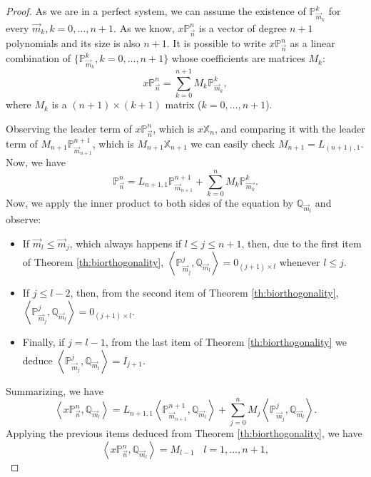 \documentclass[12pt,a4]{article}
\theoremstyle{plain}
\newcommand{\prodesc}[2]{\left\langle #1 , #2 \right\rangle}
\begin{document}
\begin{proof}
    As we are in a perfect system, we can assume the existence of $\mathbb P_{\overrightarrow{m}_k}^k$ for every $\vec m_k, k=0,\dots,n+1$. As we know, $x\mathbb P_{\vec n}^n$ is a vector of degree $n+1$ polynomials and its size is also $n+1$. It is possible to write  $x\mathbb P_{\vec n}^n$ as a linear combination of $\{\mathbb P_{\overrightarrow{m}_k}^k, k=0,\dots,n+1\}$ whose coefficients are matrices $M_k$:
    $$
    x\mathbb P_{\overrightarrow{n}}^n = \sum_{k=0}^{n+1} M_k \mathbb P_{\overrightarrow{m}_k}^k,
    $$
    where $M_k$ is a $(n+1)\times(k+1)$ matrix ($k=0,\dots,n+1$).

    Observing the leader term of $x\mathbb P_{\overrightarrow{n}}^n$, which is $x\mathbb X_{n}$, and comparing it with the leader term of $M_{n+1} \mathbb P_{\overrightarrow{m}_{n+1}}^{n+1}$, which is $M_{n+1}\mathbb X_{n+1}$ we can easily check $M_{n+1}=L_{(n+1),1}$. Now, we have
    $$
    \mathbb P_{\overrightarrow{n}}^n = L_{n+1,1}\mathbb P_{\overrightarrow{m}_{n+1}}^{n+1} + \sum_{k=0}^{n} M_k \mathbb P_{\overrightarrow{m_k}}^k.
    $$
    Now, we apply the inner product to both sides of the equation by $\mathbb Q_{\overrightarrow{m}_l}$ and observe:
    \begin{itemize}
        \item If $\overrightarrow{m}_l\leq \overrightarrow{m}_j$, which always happens if $l\leq j\leq n+1$, then, due to the first item of Theorem \ref{th:biorthogonality}, $\prodesc{\mathbb P_{\overrightarrow{m}_j}^j}{\mathbb Q_{\overrightarrow{m}_l}} = 0_{(j+1)\times l}$ whenever $l\leq j$.
        \item If $j\leq l-2$, then, from the second item of Theorem \ref{th:biorthogonality}, $\prodesc{\mathbb P_{\overrightarrow{m}_j}^j}{\mathbb Q_{\overrightarrow{m}_l}} = 0_{(j+1)\times l}.$
        \item Finally, if $j=l-1$, from the last item of Theorem \ref{th:biorthogonality} we deduce $\prodesc{\mathbb P_{\overrightarrow{m}_j}^j}{\mathbb Q_{\overrightarrow{m}_l}} = I_{j+1}.$
    \end{itemize}

    Summarizing, we have
    $$
    \prodesc{x\mathbb P_{\vec n}^n}{\mathbb Q_{\overrightarrow{m}_l}} = L_{n+1,1}\prodesc{\mathbb P_{\overrightarrow{m}_{n+1}}^{n+1}}{\mathbb Q_{\overrightarrow{m}_l}} + \sum_{j=0}^n M_j \prodesc{\mathbb P_{\overrightarrow{m}_j}^j}{\mathbb Q_{\overrightarrow{m}_l}}.
    $$
    Applying the previous items deduced from Theorem \ref{th:biorthogonality}, we have
    \begin{equation}
        \label{eq:biorthogonality-1}
        \prodesc{x\mathbb P_{\vec n}^n}{\mathbb Q_{\overrightarrow{m}_l}} = M_{l-1} \ \ \ \ l=1,\dots,n+1,
    \end{equation}


\end{proof}
\end{document}
